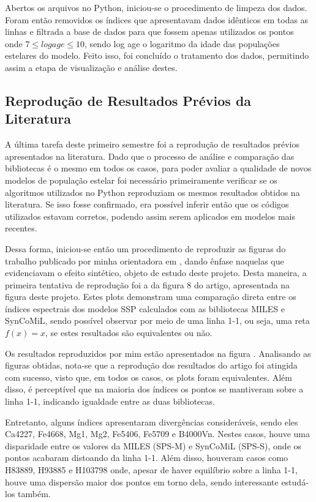 \documentclass[12pt]{projeto}
\begin{document}
Abertos os arquivos no Python, iniciou-se o procedimento de limpeza dos dados. Foram então removidos os índices que apresentavam dados idênticos em todas as linhas e filtrada a base de dados para que fossem apenas utilizados os pontos onde \(7 \leq log age \leq 10\), sendo log age o logaritmo da idade das populações estelares do modelo. Feito isso, foi concluído o tratamento dos dados, permitindo assim a etapa de visualização e análise destes. 


\subsection{Reprodução de Resultados Prévios da Literatura}
A última tarefa deste primeiro semestre foi a reprodução de resultados prévios apresentados na literatura. Dado que o processo de análise e comparação das bibliotecas é o mesmo em todos os casos, para poder avaliar a qualidade de novos modelos de população estelar foi necessário primeiramente verificar se os algoritmos utilizados no Python reproduziam os mesmos resultados obtidos na literatura. Se isso fosse confirmado, era possível inferir então que os códigos utilizados estavam corretos, podendo assim serem aplicados em modelos mais recentes.

Dessa forma, iniciou-se então um procedimento de reproduzir as figuras do trabalho publicado por minha orientadora em \cite{Paula2020}, dando ênfase naquelas que evidenciavam o efeito sintético, objeto de estudo deste projeto. Desta maneira, a primeira tentativa de reprodução foi a da figura 8 do artigo, apresentada na figura  deste projeto. Estes plots demonstram uma comparação direta entre os índices espectrais dos modelos SSP calculados com as bibliotecas MILES  e SynCoMiL, sendo possível observar por meio de uma linha 1-1, ou seja, uma reta \(f(x) = x\), se estes resultados são equivalentes ou não.



Os resultados reproduzidos por mim estão apresentados na figura .
Analisando as figuras obtidas, nota-se que a reprodução dos resultados do artigo foi atingida com sucesso, visto que, em todos os casos, os plots foram equivalentes. Além disso, é perceptível que na maioria dos índices os pontos se mantiveram sobre a linha 1-1, indicando igualdade entre as duas bibliotecas. 

Entretanto, alguns índices apresentaram divergências consideráveis, sendo eles Ca4227, Fe4668, Mg1, Mg2, Fe5406, Fe5709 e B4000Vn. Nestes casos, houve uma disparidade entre os valores da MILES (SPS-M) e SynCoMiL (SPS-S), onde os pontos acabaram distoando da linha 1-1. Além disso, houveram casos como H83889, H93885 e H103798 onde, apesar de haver equilíbrio sobre a linha 1-1, houve uma dispersão maior dos pontos em torno dela, sendo interessante estudá-los também. 
\end{document}
